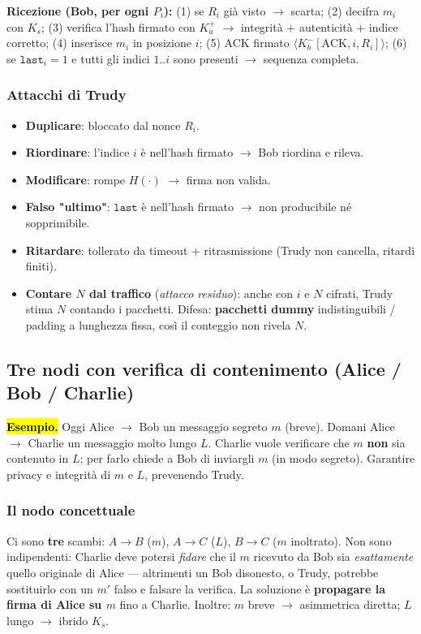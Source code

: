 \documentclass[11pt,a4paper]{report}
\begin{document}
\noindent\textbf{Ricezione (Bob, per ogni $P_i$):} (1) se $R_i$ già visto $\to$
scarta; (2) decifra $m_i$ con $K_s$; (3) verifica l'hash firmato con $K_a^+$
$\to$ integrità + autenticità + indice corretto; (4) inserisce $m_i$ in posizione
$i$; (5) ACK firmato $\langle K_b^-[\text{ACK}, i, R_i]\rangle$; (6) se
$\texttt{last}_i=1$ e tutti gli indici $1..i$ sono presenti $\to$ sequenza completa.

\subsubsection*{Attacchi di Trudy}
\begin{itemize}[noitemsep]
\item \textbf{Duplicare}: bloccato dal nonce $R_i$.
\item \textbf{Riordinare}: l'indice $i$ è nell'hash firmato $\to$ Bob riordina e rileva.
\item \textbf{Modificare}: rompe $H(\cdot)$ $\to$ firma non valida.
\item \textbf{Falso "ultimo"}: $\texttt{last}$ è nell'hash firmato $\to$ non
producibile né sopprimibile.
\item \textbf{Ritardare}: tollerato da timeout + ritrasmissione (Trudy non cancella,
ritardi finiti).
\item \textbf{Contare $N$ dal traffico} (\emph{attacco residuo}): anche con $i$ e
$N$ cifrati, Trudy stima $N$ contando i pacchetti. Difesa: \textbf{pacchetti dummy}
indistinguibili / padding a lunghezza fissa, così il conteggio non rivela $N$.
\end{itemize}

\subsection{Tre nodi con verifica di contenimento (Alice / Bob / Charlie)}

\hl{\textbf{Esempio.}} Oggi Alice $\to$ Bob un messaggio segreto $m$ (breve).
Domani Alice $\to$ Charlie un messaggio molto lungo $L$. Charlie vuole verificare
che $m$ \textbf{non} sia contenuto in $L$; per farlo chiede a Bob di inviargli $m$
(in modo segreto). Garantire privacy e integrità di $m$ e $L$, prevenendo Trudy.

\subsubsection*{Il nodo concettuale}
Ci sono \textbf{tre} scambi: $A\to B$ ($m$), $A\to C$ ($L$), $B\to C$ ($m$
inoltrato). Non sono indipendenti: Charlie deve potersi \emph{fidare} che il $m$
ricevuto da Bob sia \emph{esattamente} quello originale di Alice --- altrimenti un
Bob disonesto, o Trudy, potrebbe sostituirlo con un $m'$ falso e falsare la
verifica. La soluzione è \textbf{propagare la firma di Alice su $m$} fino a Charlie.
Inoltre: $m$ breve $\to$ asimmetrica diretta; $L$ lungo $\to$ ibrido $K_s$.
\end{document}
